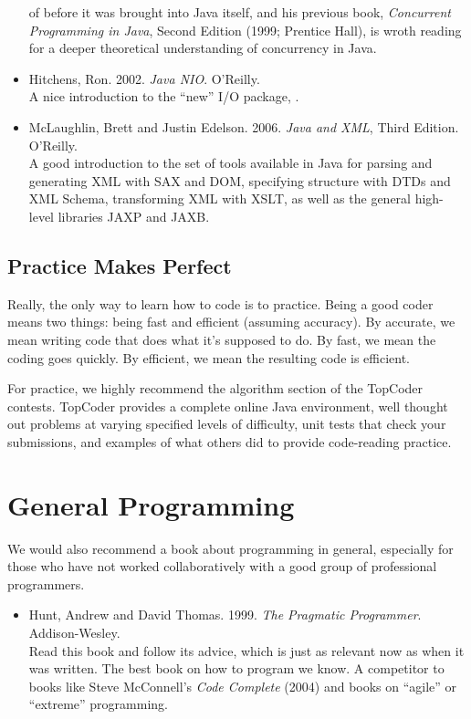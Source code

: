 \begin{itemize}
{of  before it was brought into Java itself, and
his previous book, {\it Concurrent Programming in Java}, Second
Edition (1999; Prentice Hall), is wroth reading for a deeper theoretical
understanding of concurrency in Java.}
%
\item
Hitchens, Ron. 2002.  {\it Java NIO}. O'Reilly.
\\
{\footnotesize A nice introduction to the ``new'' I/O package, .}
%
\item
McLaughlin, Brett and Justin Edelson. 2006. {\it Java and XML}, Third Edition. O'Reilly.
\\
{\footnotesize A good introduction to the set of tools available in
Java for parsing and generating XML with SAX and DOM, specifying structure
with DTDs and XML Schema, transforming XML with XSLT, as well as the general 
high-level libraries JAXP and JAXB.}
\end{itemize}



\subsection{Practice Makes Perfect}

\noindent
Really, the only way to learn how to code is to practice.  Being a
good coder means two things: being fast and efficient (assuming
accuracy).  By accurate, we mean writing code that does what it's
supposed to do.  By fast, we mean the coding goes quickly.  By efficient,
we mean the resulting code is efficient.

For practice, we highly recommend the algorithm section of the
TopCoder contests.  TopCoder provides a complete online Java
environment, well thought out problems at varying specified levels of
difficulty, unit tests that check your submissions, and examples of
what others did to provide code-reading practice.
%
\begin{quote}
\end{quote}
%



\section{General Programming}

\noindent
We would also recommend a book about programming in general, 
especially for those who have not worked collaboratively with
a good group of professional programmers.
%
\begin{itemize}
\item Hunt, Andrew and David Thomas.
1999.
{\it The Pragmatic Programmer}.
Addison-Wesley.
\\
{\footnotesize Read this book and follow its advice, which is just as relevant now
as when it was written.  The best book on how to program
we know.  A competitor to books like Steve McConnell's {\it Code Complete} (2004)
and books on ``agile'' or ``extreme'' programming.}
\end{itemize}


